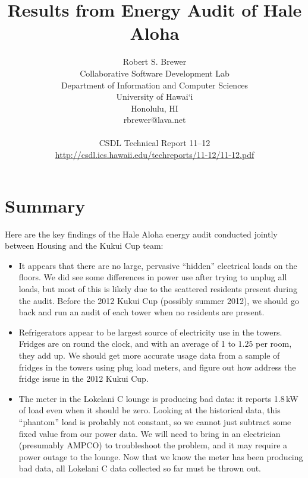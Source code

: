 \documentclass[11pt,draft]{article}
\newcommand{\kW}{\,kW\xspace}
\begin{document}
\title{Results from Energy Audit of Hale Aloha}
\author{Robert S. Brewer \\
Collaborative Software Development Lab \\
Department of Information and Computer Sciences \\
University of Hawai`i \\
Honolulu, HI \\
rbrewer@lava.net \\
\\
CSDL Technical Report 11--12 \\
\url{http://csdl.ics.hawaii.edu/techreports/11-12/11-12.pdf}
}

\maketitle

\section{Summary}

Here are the key findings of the Hale Aloha energy audit conducted jointly between Housing and the Kukui Cup team:

\begin{itemize}
\item It appears that there are no large, pervasive ``hidden'' electrical loads on the floors. We did see some differences in power use after trying to unplug all loads, but most of this is likely due to the scattered residents present during the audit. Before the 2012 Kukui Cup (possibly summer 2012), we should go back and run an audit of each tower when no residents are present.
\item Refrigerators appear to be largest source of electricity use in the towers. Fridges are on round the clock, and with an average of 1 to $1.25$ per room, they add up. We should get more accurate usage data from a sample of fridges in the towers using plug load meters, and figure out how address the fridge issue in the 2012 Kukui Cup.
\item The meter in the Lokelani C lounge is producing bad data: it reports 1.8\kW of load even when it should be zero. Looking at the historical data, this ``phantom'' load is probably not constant, so we cannot just subtract some fixed value from our power data. We will need to bring in an electrician (presumably AMPCO) to troubleshoot the problem, and it may require a power outage to the lounge. Now that we know the meter has been producing bad data, all Lokelani C data collected so far must be thrown out.
\end{itemize}
\end{document}
